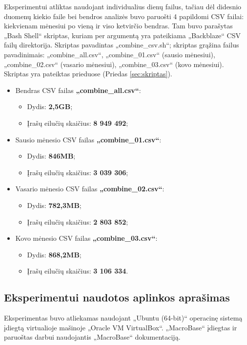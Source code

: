 \documentclass{VUMIFPSkursinis}
\begin{document}
Eksperimentui atliktas naudojant individualius dienų failus, tačiau dėl didesnio duomenų kiekio faile bei bendros analizės buvo paruošti 4 papildomi CSV failai: kiekvienam mėnesiui po vieną ir viso ketvirčio bendras. Tam buvo parašytas „Bash Shell“ skriptas, kuriam per argumentą yra pateikiama „Backblaze“ CSV failų direktorija. Skriptas pavadintas „combine\_csv.sh“; skriptas grąžina failus pavadinimais: „combine\_all.csv“, „combine\_01.csv“ (sausio mėnesiui), „combine\_02.csv“ (vasario mėnesiui), „combine\_03.csv“ (kovo mėnesiui). Skriptas yra pateiktas prieduose (Priedas \ref{sec:skriptas}).
\begin{itemize}
\item Bendras CSV failas \textbf{„combine\_all.csv“}:
\begin{itemize}
\item Dydis: \textbf{2,5GB};
\item Įrašų eilučių skaičius: \textbf{8 949 492};
\end{itemize}

\item Sausio mėnesio CSV failas \textbf{„combine\_01.csv“}:
\begin{itemize}
\item Dydis: \textbf{846MB};
\item Įrašų eilučių skaičius: \textbf{3 039 306};
\end{itemize}

\item Vasario mėnesio CSV failas \textbf{„combine\_02.csv“}:
\begin{itemize}
\item Dydis: \textbf{782,3MB};
\item Įrašų eilučių skaičius: \textbf{2 803 852};
\end{itemize}

\item Kovo mėnesio CSV failas \textbf{„combine\_03.csv“}:
\begin{itemize}
\item Dydis: \textbf{868,2MB};
\item Įrašų eilučių skaičius: \textbf{3 106 334}.
\end{itemize}
\end{itemize}

\subsection{Eksperimentui naudotos aplinkos aprašimas}
Eksperimentas buvo atliekamas naudojant „Ubuntu (64-bit)“ operacinę sistemą įdiegtą virtualioje mašinoje „Oracle VM VirtualBox“. „MacroBase“ įdiegtas ir paruoštas darbui naudojantis „MacroBase“ dokumentaciją.
\end{document}
